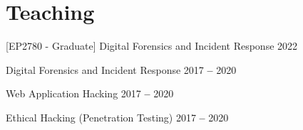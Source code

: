
\section{Teaching}

    
    
        \teachingItem
            {[EP2780 - Graduate] Digital Forensics and Incident Response \small{\href{https://www.kth.se/student/kurser/kurs/EP2780?l=en}{\faLink}}}
            {2022}
            
    \itemizeCVEnd



        \teachingItem
            {Digital Forensics and Incident Response}
            {2017 \textbf{--} 2020}
        
        \teachingItem
            {Web Application Hacking}
            {2017 \textbf{--} 2020}
           
        \teachingItem
            {Ethical Hacking (Penetration Testing)}
            {2017 \textbf{--} 2020}
        
    \itemizeCVEnd

